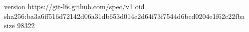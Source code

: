 version https://git-lfs.github.com/spec/v1
oid sha256:ba3a6ff516d72142d06a31db653d014c2d64f73f7544d6bcd0204e1f62c22fba
size 98322
